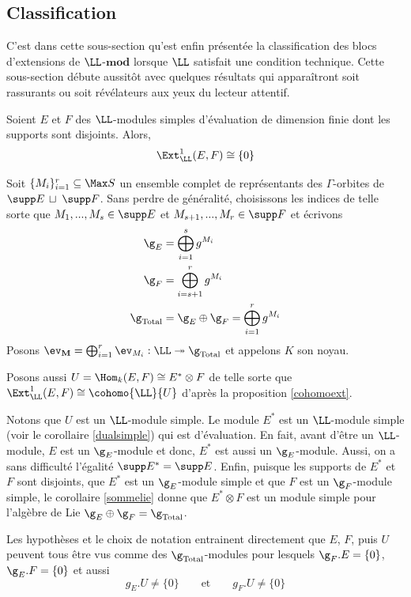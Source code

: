 %
\subsection{Classification}

C'est dans cette sous-section qu'est enfin présentée la classification des blocs d'extensions de $\LL$-$\mathbf{mod}$ lorsque $\LL$ satisfait une condition technique. Cette sous-section débute aussitôt avec quelques résultats qui apparaîtront soit rassurants ou soit révélateurs aux yeux du lecteur attentif.
  
\begin{Prop} \label{suppdisjoints} Soient $E$ et $F$ des $\LL$-modules simples d'\'evaluation de dimension finie dont les supports sont disjoints. Alors,
$$ \Ext_\LL^1(E,F) \cong \{0\} $$
\begin{pre} Soit $\{M_i\}_{i=1}^r \subseteq \Max S$ un ensemble complet de représentants des $\Gamma$-orbites de $\supp E \, \sqcup \; \supp F$. Sans perdre de généralité, choisissons les indices de telle sorte que \linebreak $M_1, ... , M_s \in \supp E$ et $M_{s+1}, ..., M_r \in \supp F$ et écrivons
\begin{align*}
\g_{E} &= \bigoplus_{i=1}^s g^{M_i} \\
\g_{F} &= \bigoplus_{i=s+1}^r g^{M_i} \\
\g_\text{Total} &= \g_E \oplus \g_F = \bigoplus_{i=1}^r g^{M_i}
\end{align*}
Posons $\ev_\mathbf{M} = \bigoplus_{i=1}^r \ev_{M_i} : \LL \twoheadrightarrow \g_\text{Total}$ et appelons $K$ son noyau. 

Posons aussi $U = \Hom_k(E,F) \cong E^* \otimes F$ de telle sorte que $\Ext_\LL^1(E,F) \cong \cohomo{\LL}{U}$ d'après la proposition \ref{cohomoext}. 

Notons que $U$ est un $\LL$-module simple. Le module $E^*$ est un $\LL$-module simple (voir le corollaire \ref{dualsimple}) qui est d'évaluation. En fait, avant d'être un $\LL$-module, $E$ est un $\g_E$-module et donc, $E^*$ est aussi un $\g_E$-module. Aussi, on a sans difficulté l'égalité $\supp E^* = \supp E$. Enfin, puisque les supports de $E^*$ et $F$ sont disjoints, que $E^*$ est un $\g_E$-module simple et que $F$ est un $\g_F$-module simple, le corollaire \ref{sommelie} donne que $E^* \otimes F$ est un module simple pour l'algèbre de Lie $\g_E \oplus \g_F = \g_\text{Total}$.

Les hypothèses et le choix de notation entrainent directement que $E$, $F$, puis $U$ peuvent tous être vus comme des $\g_\text{Total}$-modules pour lesquels $\g_F.E = \{0\}$, $\g_E.F = \{0\}$ et aussi
\begin{equation} \label{propriosu}
g_E.U \neq \{0\} \qquad \text{et} \qquad g_F.U \neq \{0\}
\end{equation}


\end{pre}
\end{Prop}
